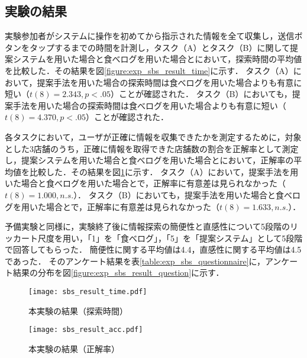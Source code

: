  \subsection{実験の結果}
    実験参加者がシステムに操作を初めてから指示された情報を全て収集し，送信ボタンをタップするまでの時間を計測し，タスク（A）とタスク（B）に関して提案システムを用いた場合と食べログを用いた場合とにおいて，探索時間の平均値を比較した．その結果を図\ref{figure:exp_sbs_result_time}に示す．
    タスク（A）において，提案手法を用いた場合の探索時間は食べログを用いた場合よりも有意に短い（$t(8)=2.343, p<.05$）ことが確認された．
    タスク（B）においても，提案手法を用いた場合の探索時間は食べログを用いた場合よりも有意に短い（$t(8)=4.370, p<.05$）ことが確認された．

    各タスクにおいて，ユーザが正確に情報を収集できたかを測定するために，対象とした3店舗のうち，正確に情報を取得できた店舗数の割合を正解率として測定し，提案システムを用いた場合と食べログを用いた場合とにおいて，正解率の平均値を比較した．その結果を図\ref{figure:exp_sbs_result_acc}に示す．
    タスク（A）において，提案手法を用いた場合と食べログを用いた場合とで，正解率に有意差は見られなかった（$t(8)=1.000, n.s.$）．
    タスク（B）においても，提案手法を用いた場合と食べログを用いた場合とで，正解率に有意差は見られなかった（$t(8)=1.633, n.s.$）．

    予備実験と同様に，実験終了後に情報探索の簡便性と直感性について5段階のリッカート尺度を用い，「1」を「食べログ」，「5」を「提案システム」として5段階で回答してもらった．
    簡便性に関する平均値は4.4，直感性に関する平均値は4.5であった．
    そのアンケート結果を表\ref{table:exp_sbs_questionnaire}に，アンケート結果の分布を図\ref{figure:exp_sbs_result_question}に示す．
    
    \begin{figure}[tb]
      \begin{center}
        \texttt{[image: sbs\_result\_time.pdf]}
        \caption{本実験の結果（探索時間）}
        \label{figure:exp_sbs_result_time}
      \end{center}
      \vspace{1cm}
      \begin{center}
        \texttt{[image: sbs\_result\_acc.pdf]}
        \caption{本実験の結果（正解率）}
        \label{figure:exp_sbs_result_acc}
      \end{center}
    \end{figure}

